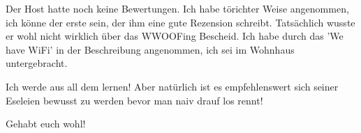 Der Host hatte noch keine Bewertungen. Ich habe törichter Weise
angenommen, ich könne der erste sein, der ihm eine gute Rezension
schreibt. Tatsächlich wusste er wohl nicht wirklich über das WWOOFing
Bescheid. Ich habe durch das 'We have WiFi' in der Beschreibung
angenommen, ich sei im Wohnhaus untergebracht.

Ich werde aus all dem lernen! Aber natürlich ist es empfehlenswert sich
seiner Eseleien bewusst zu werden bevor man naiv drauf los rennt!

Gehabt euch wohl!
